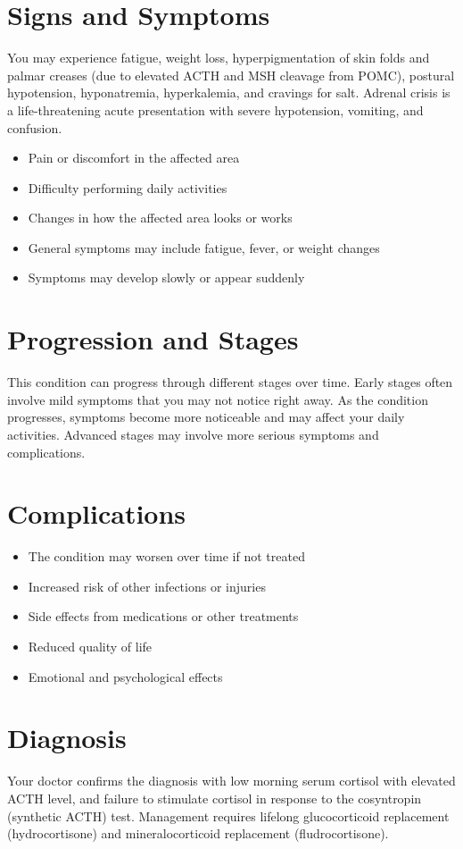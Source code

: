 \section{Signs and Symptoms}
You may experience fatigue, weight loss, hyperpigmentation of skin folds and palmar creases (due to elevated ACTH and MSH cleavage from POMC), postural hypotension, hyponatremia, hyperkalemia, and cravings for salt. Adrenal crisis is a life-threatening acute presentation with severe hypotension, vomiting, and confusion.

\begin{itemize}[noitemsep]
  \item Pain or discomfort in the affected area
  \item Difficulty performing daily activities
  \item Changes in how the affected area looks or works
  \item General symptoms may include fatigue, fever, or weight changes
  \item Symptoms may develop slowly or appear suddenly
\end{itemize}

\section{Progression and Stages}
This condition can progress through different stages over time. Early stages often involve mild symptoms that you may not notice right away. As the condition progresses, symptoms become more noticeable and may affect your daily activities. Advanced stages may involve more serious symptoms and complications.

\section{Complications}

\begin{itemize}[noitemsep]
  \item The condition may worsen over time if not treated
  \item Increased risk of other infections or injuries
  \item Side effects from medications or other treatments
  \item Reduced quality of life
  \item Emotional and psychological effects
\end{itemize}

\section{Diagnosis}
Your doctor confirms the diagnosis with low morning serum cortisol with elevated ACTH level, and failure to stimulate cortisol in response to the cosyntropin (synthetic ACTH) test. Management requires lifelong glucocorticoid replacement (hydrocortisone) and mineralocorticoid replacement (fludrocortisone).

